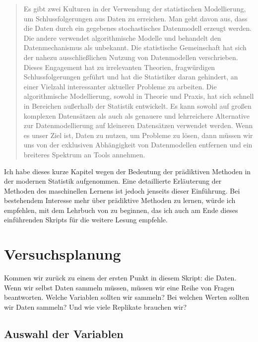 \documentclass[a4paper,twoside]{tufte-book}\usepackage[]{graphicx}\usepackage[]{color}
\begin{document}
\begin{quote}
Es gibt zwei Kulturen in der Verwendung der statistischen Modellierung, um Schlussfolgerungen aus Daten zu erreichen. Man geht davon aus, dass die Daten durch ein gegebenes stochastisches Datenmodell erzeugt werden. Die andere verwendet algorithmische Modelle und behandelt den Datenmechanismus als unbekannt. Die statistische Gemeinschaft hat sich der nahezu ausschließlichen Nutzung von Datenmodellen verschrieben. Dieses Engagement hat zu irrelevanten Theorien, fragwürdigen Schlussfolgerungen geführt und hat die Statistiker daran gehindert, an einer Vielzahl interessanter aktueller Probleme zu arbeiten. Die algorithmische Modellierung, sowohl in Theorie und Praxis, hat sich schnell in Bereichen außerhalb der Statistik entwickelt. Es kann sowohl auf großen komplexen Datensätzen als auch als genauere und lehrreichere Alternative zur Datenmodellierung auf kleineren Datensätzen verwendet werden. Wenn es unser Ziel ist, Daten zu nutzen, um Probleme zu lösen, dann müssen wir uns von der exklusiven Abhängigkeit von Datenmodellen entfernen und ein breiteres Spektrum an Tools annehmen.
\end{quote}


Ich habe dieses kurze Kapitel wegen der Bedeutung der prädiktiven Methoden in der modernen Statistik aufgenommen. Eine detaillierte Erläuterung der Methoden des maschinellen Lernens ist jedoch jenseits dieser Einführung. Bei bestehendem Interesse mehr über prädiktive Methoden zu lernen, würde ich empfehlen, mit dem Lehrbuch von \citet{James-IntroductiontoStatistical-2013}zu beginnen, das ich auch am Ende dieses einführenden Skripts für die weitere Lesung empfehle.

\chapter{Versuchsplanung}\label{cha: design of experiments}

Kommen wir zurück zu einem der ersten Punkt in diesem Skript: die Daten. Wenn wir selbst Daten sammeln müssen, müssen wir eine Reihe von Fragen beantworten. Welche Variablen sollten wir sammeln? Bei welchen Werten sollten wir Daten sammeln? Und wie viele Replikate brauchen wir?


\section{Auswahl der Variablen}
\end{document}
